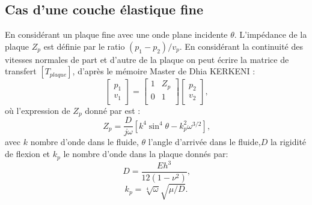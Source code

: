 \documentclass[12pt,foolscap]{report}
\begin{document}
	\subsection{Cas d'une couche  élastique fine}
	En considérant un plaque fine avec une onde plane incidente $\theta$. L'impédance de la plaque $Z_p$ est définie par le ratio $(p_1- p_2)/v_p$. En considérant la continuité des vitesses normales de part et d'autre de la plaque on peut écrire la matrice de transfert $[T_{plaque}]$, d'après le mémoire Master de Dhia KERKENI \cite{thesis1}:
	\begin{equation}
	\begin{bmatrix}
	p_1 \\v_1
	\end{bmatrix}=
	\begin{bmatrix}
	1 &Z_p\\
	0 &1\\
	\end{bmatrix}
	\begin{bmatrix}
	p_2 \\v_2
	\end{bmatrix} \text{,}
	\end{equation}
	où l'expression de $Z_p$ donné par \cite{vigran2008room} est :
	\begin{equation}
	Z_p =  \frac{D}{j\omega}\left[k^4\sin^4\theta-k_p^2 \omega^{3/2}\right]\text{,}
	\end{equation}
	avec  $k$ nombre d'onde dans le fluide, $\theta$ l'angle d'arrivée dans le fluide,$D$ la rigidité de flexion et $k_p$ le nombre d'onde dans la plaque donnés par:
	\begin{equation}
	D = \frac{E h^3}{12(1-\nu^2)}\text{,}
	\end{equation}
	\begin{equation}
	k_p = \sqrt[4]{\omega}\sqrt{\mu/D}\text{.}
	\end{equation}
	
\end{document}
